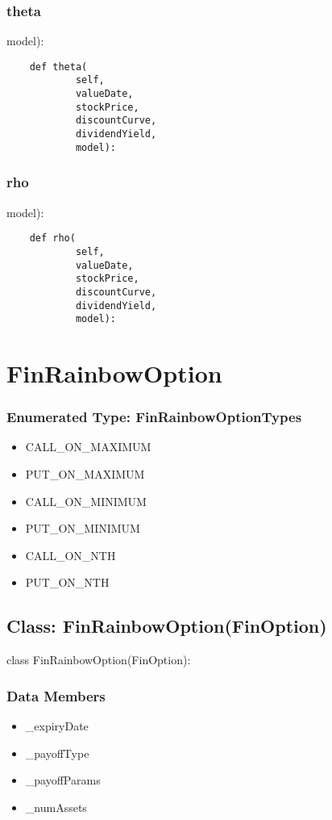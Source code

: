 \documentclass[twoside,11pt]{book}
\begin{document}
\subsubsection*{{\bf theta}}
model): 

\begin{lstlisting}
    def theta(
            self,
            valueDate,
            stockPrice,
            discountCurve,
            dividendYield,
            model):
\end{lstlisting}

\subsubsection*{{\bf rho}}
model): 

\begin{lstlisting}
    def rho(
            self,
            valueDate,
            stockPrice,
            discountCurve,
            dividendYield,
            model):
\end{lstlisting}

\newpage
\section{FinRainbowOption}

\subsubsection{Enumerated Type: FinRainbowOptionTypes}
\begin{itemize}
\item{CALL\_ON\_MAXIMUM}
\item{PUT\_ON\_MAXIMUM}
\item{CALL\_ON\_MINIMUM}
\item{PUT\_ON\_MINIMUM}
\item{CALL\_ON\_NTH}
\item{PUT\_ON\_NTH}
\end{itemize}

\subsection*{Class: FinRainbowOption(FinOption)}
class FinRainbowOption(FinOption): 

\subsubsection*{Data Members}
\begin{itemize}
\item{\_expiryDate}
\item{\_payoffType}
\item{\_payoffParams}
\item{\_numAssets}
\end{itemize}
\end{document}

